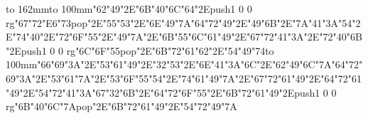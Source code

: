 \hbox to 162mm{\hsize=69mm\vbox to 100mm{\vfill\ipa\char"62\ipa\char"49\ipa\char"2E\ipa\char"6B\ipa\char"40\ipa\char"6C\ipa\char"64\ipa\char"2E\pdfcolorstack\match push{1 0 0 rg}\ipa\char"67\ipa\char"72\ipa\char"E6\ipa\char"73\pdfcolorstack\match pop{}\ipa\char"2E\ipa\char"55\ipa\char"53\ipa\char"2E\ipa\char"6E\ipa\char"49\ipa\char"7A\medskip\ipa\char"64\ipa\char"72\ipa\char"49\ipa\char"2E\ipa\char"49\ipa\char"6B\ipa\char"2E\ipa\char"7A\ipa\char"41\ipa\char"3A\ipa\char"54\ipa\char"2E\ipa\char"74\ipa\char"40\ipa\char"2E\ipa\char"72\ipa\char"6F\ipa\char"55\ipa\char"2E\ipa\char"49\ipa\char"7A\ipa\char"2E\ipa\char"6B\ipa\char"55\medskip\ipa\char"6C\ipa\char"61\ipa\char"49\ipa\char"2E\ipa\char"67\ipa\char"72\ipa\char"41\ipa\char"3A\ipa\char"2E\ipa\char"72\ipa\char"40\ipa\char"6B\ipa\char"2E\pdfcolorstack\match push{1 0 0 rg}\ipa\char"6C\ipa\char"6F\ipa\char"55\pdfcolorstack\match pop{}\ipa\char"2E\ipa\char"6B\ipa\char"72\ipa\char"61\ipa\char"62\ipa\char"2E\ipa\char"54\ipa\char"49\ipa\char"74\vfill}\hfill\vbox to 100mm{\vfill\ipa\char"66\ipa\char"69\ipa\char"3A\ipa\char"2E\ipa\char"53\ipa\char"61\ipa\char"49\ipa\char"2E\ipa\char"32\ipa\char"53\ipa\char"2E\ipa\char"6E\ipa\char"41\ipa\char"3A\ipa\char"6C\ipa\char"2E\ipa\char"62\ipa\char"49\ipa\char"6C\ipa\char"7A\medskip\ipa\char"64\ipa\char"72\ipa\char"69\ipa\char"3A\ipa\char"2E\ipa\char"53\ipa\char"61\ipa\char"7A\ipa\char"2E\ipa\char"53\ipa\char"6F\ipa\char"55\ipa\char"54\ipa\char"2E\ipa\char"74\ipa\char"61\ipa\char"49\ipa\char"7A\ipa\char"2E\ipa\char"67\ipa\char"72\ipa\char"61\ipa\char"49\ipa\char"2E\ipa\char"64\ipa\char"72\ipa\char"61\ipa\char"49\ipa\char"2E\ipa\char"54\ipa\char"72\ipa\char"41\ipa\char"3A\medskip\ipa\char"67\ipa\char"32\ipa\char"6B\ipa\char"2E\ipa\char"64\ipa\char"72\ipa\char"6F\ipa\char"55\ipa\char"2E\ipa\char"6B\ipa\char"72\ipa\char"61\ipa\char"49\ipa\char"2E\pdfcolorstack\match push{1 0 0 rg}\ipa\char"6B\ipa\char"40\ipa\char"6C\ipa\char"7A\pdfcolorstack\match pop{}\ipa\char"2E\ipa\char"6B\ipa\char"72\ipa\char"61\ipa\char"49\ipa\char"2E\ipa\char"54\ipa\char"72\ipa\char"49\ipa\char"7A\vfill}}\eject
